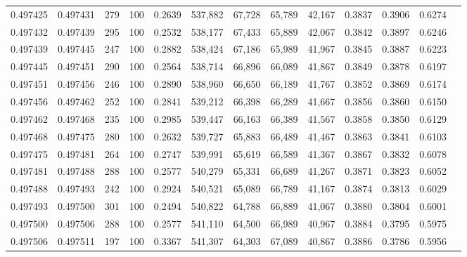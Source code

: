 \begin{tabular}{rrrrrrrrrrrrr}
0.497425 & 0.497431 &   279 & 100 &                                     0.2639 & 537,882 &  67,728 &  65,789 &  42,167 & 0.3837 & 0.3906 & 0.6274 \\
0.497432 & 0.497439 &   295 & 100 &                                     0.2532 & 538,177 &  67,433 &  65,889 &  42,067 & 0.3842 & 0.3897 & 0.6246 \\
0.497439 & 0.497445 &   247 & 100 &                                     0.2882 & 538,424 &  67,186 &  65,989 &  41,967 & 0.3845 & 0.3887 & 0.6223 \\
0.497445 & 0.497451 &   290 & 100 &                                     0.2564 & 538,714 &  66,896 &  66,089 &  41,867 & 0.3849 & 0.3878 & 0.6197 \\
0.497451 & 0.497456 &   246 & 100 &                                     0.2890 & 538,960 &  66,650 &  66,189 &  41,767 & 0.3852 & 0.3869 & 0.6174 \\
0.497456 & 0.497462 &   252 & 100 &                                     0.2841 & 539,212 &  66,398 &  66,289 &  41,667 & 0.3856 & 0.3860 & 0.6150 \\
0.497462 & 0.497468 &   235 & 100 &                                     0.2985 & 539,447 &  66,163 &  66,389 &  41,567 & 0.3858 & 0.3850 & 0.6129 \\
0.497468 & 0.497475 &   280 & 100 &                                     0.2632 & 539,727 &  65,883 &  66,489 &  41,467 & 0.3863 & 0.3841 & 0.6103 \\
0.497475 & 0.497481 &   264 & 100 &                                     0.2747 & 539,991 &  65,619 &  66,589 &  41,367 & 0.3867 & 0.3832 & 0.6078 \\
0.497481 & 0.497488 &   288 & 100 &                                     0.2577 & 540,279 &  65,331 &  66,689 &  41,267 & 0.3871 & 0.3823 & 0.6052 \\
0.497488 & 0.497493 &   242 & 100 &                                     0.2924 & 540,521 &  65,089 &  66,789 &  41,167 & 0.3874 & 0.3813 & 0.6029 \\
0.497493 & 0.497500 &   301 & 100 &                                     0.2494 & 540,822 &  64,788 &  66,889 &  41,067 & 0.3880 & 0.3804 & 0.6001 \\
0.497500 & 0.497506 &   288 & 100 &                                     0.2577 & 541,110 &  64,500 &  66,989 &  40,967 & 0.3884 & 0.3795 & 0.5975 \\
0.497506 & 0.497511 &   197 & 100 &                                     0.3367 & 541,307 &  64,303 &  67,089 &  40,867 & 0.3886 & 0.3786 & 0.5956 \\

\end{tabular}
